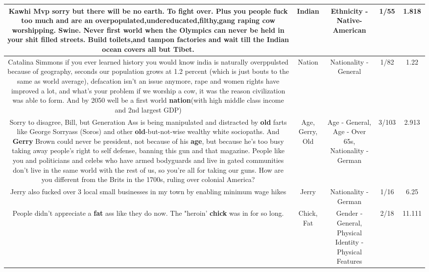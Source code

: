 \documentclass[11pt]{article}
\newlength\mylength
\begin{document}
\begin{center}
\begin{longtable}{|C{.65\mylength}|C{.30\mylength}|C{.12\mylength}|C{.12\mylength}|C{.12\mylength}|}
  \small Kawhi Mvp sorry but there will be no earth. To fight over. Plus you people fuck too much and are an overpopulated,undereducated,filthy,gang raping cow worshipping. Swine. Never first world when the Olympics can never be held in your shit filled streets. Build toilets,and tampon factories and wait till the \textbf{Indian} ocean covers all but Tibet.\normalsize   & Indian & Ethnicity - Native-American & 1/55 & 1.818 \\  \hline
  \small Catalina Simmons if you ever learned history you would know india is naturally overppulsted because of geography, seconds our population grows at 1.2 percent (which is just bouts to the same as world average), defacation isn't an issue anymore, rape and women rights have improved a lot, and what's your problem if we worship a cow, it was the reason civilization was able to form. And by 2050 well be a first world \textbf{nation}(with high middle class income and 2nd largest GDP)\normalsize   & Nation & Nationality - General & 1/82 & 1.22 \\  \hline
  \small Sorry to disagree, Bill, but Generation Ass is being manipulated and distracted by \textbf{old} farts like George Sorryass (Soros) and other \textbf{old}-but-not-wise wealthy white sociopaths. And \textbf{Gerry} Brown could never be president, not because of his \textbf{age}, but because he's too busy taking away people's right to self defense, banning this gun and that magazine. People like you and politicians and celebs who have armed bodyguards and live in gated communities don't live in the same world with the rest of us, so you're all for taking our guns. How are you different from the Brits in the 1700s, ruling over colonial America?\normalsize   & Age, Gerry, Old & Age - General, Age - Over 65s, Nationality - German & 3/103 & 2.913 \\  \hline
  \small Jerry also fucked over 3 local small businesses in my town by enabling minimum wage hikes\normalsize   & Jerry & Nationality - German & 1/16 & 6.25 \\  \hline
  \small People didn't appreciate a \textbf{fat} ass like they do now. The "heroin' \textbf{chick} was in for so long.\normalsize   & Chick, Fat & Gender - General, Physical Identity - Physical Features & 2/18 & 11.111 \\  \hline

\end{longtable}
\end{center}
\end{document}
